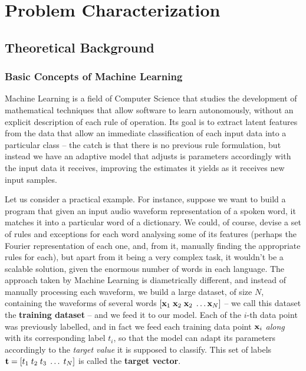 \chapter{Problem Characterization}\label{chap:theorBack}

\section{Theoretical Background}\label{sec:tb}

\subsection{Basic Concepts of Machine Learning}\label{sec:tb_basicCon}
Machine Learning is a field of Computer Science that studies the development of mathematical techniques that allow software to learn autonomously, without an explicit description of each rule of operation. Its goal is to extract latent features from the data that allow an immediate classification of each input data into a particular class -- the catch is that there is no previous rule formulation, but instead we have an adaptive model that adjusts is parameters accordingly with the input data it receives, improving the estimates it yields as it receives new input samples. 

Let us consider a practical example. For instance, suppose we want to build a program that given an input audio waveform representation of a spoken word, it matches it into a particular word of a dictionary. We could, of course, devise a set of rules and exceptions for each word analysing some of its features (perhaps the Fourier representation of each one, and, from it, manually finding the appropriate rules for each), but apart from it being a very complex task, it wouldn't be a scalable solution, given the enormous number of words in each language. The approach taken by Machine Learning is diametrically different, and instead of manually processing each waveform, we build a large dataset, of size $N$, containing the waveforms of several words $\left[ \mathbf{x}_1 \; \mathbf{x}_2 \;\mathbf{x}_2 \; \dots \mathbf{x}_N \right]$ -- we call this dataset the \textbf{training dataset} -- and we feed it to our model. Each of the $i$-th data point was previously labelled, and in fact we feed each training data point $\mathbf{x}_i$ \emph{along} with its corresponding label $t_i$, so that the model can adapt its parameters accordingly to the \emph{target value} it is supposed to classify. This set of labels $\mathbf{t} = \left[ t_1 \; t_2 \; t_3 \; \dots \; t_N \right]$ is called the \textbf{target vector}. 

